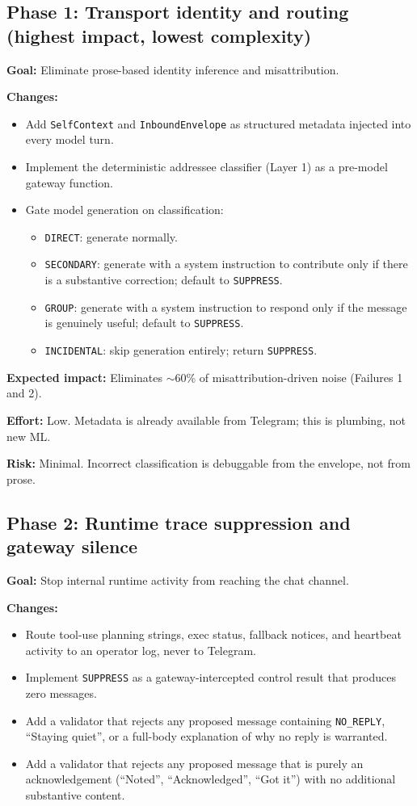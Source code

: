\documentclass[11pt]{article}
\begin{document}
\subsection{Phase 1: Transport identity and routing (highest impact, lowest complexity)}

\textbf{Goal:} Eliminate prose-based identity inference and misattribution.

\textbf{Changes:}
\begin{itemize}
\item Add \texttt{SelfContext} and \texttt{InboundEnvelope} as structured
metadata injected into every model turn.
\item Implement the deterministic addressee classifier
(Layer 1) as a pre-model gateway function.
\item Gate model generation on classification:
\begin{itemize}
\item \texttt{DIRECT}: generate normally.
\item \texttt{SECONDARY}: generate with a system instruction to contribute
only if there is a substantive correction; default to \texttt{SUPPRESS}.
\item \texttt{GROUP}: generate with a system instruction to respond only if
the message is genuinely useful; default to \texttt{SUPPRESS}.
\item \texttt{INCIDENTAL}: skip generation entirely; return
\texttt{SUPPRESS}.
\end{itemize}
\end{itemize}

\textbf{Expected impact:} Eliminates $\sim$60\% of misattribution-driven
noise (Failures 1 and 2).

\textbf{Effort:} Low.  Metadata is already available from Telegram; this is
plumbing, not new ML.

\textbf{Risk:} Minimal.  Incorrect classification is debuggable from the
envelope, not from prose.

\subsection{Phase 2: Runtime trace suppression and gateway silence}

\textbf{Goal:} Stop internal runtime activity from reaching the chat channel.

\textbf{Changes:}
\begin{itemize}
\item Route tool-use planning strings, exec status, fallback notices, and
heartbeat activity to an operator log, never to Telegram.
\item Implement \texttt{SUPPRESS} as a gateway-intercepted control result
that produces zero messages.
\item Add a validator that rejects any proposed message containing
\texttt{NO\_REPLY}, ``Staying quiet'', or a full-body explanation of why
no reply is warranted.
\item Add a validator that rejects any proposed message that is purely an
acknowledgement (``Noted'', ``Acknowledged'', ``Got it'') with no additional
substantive content.
\end{itemize}
\end{document}
